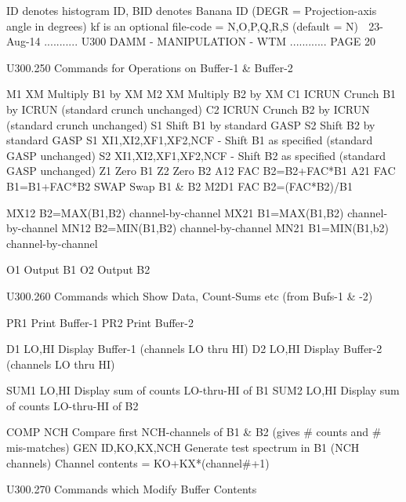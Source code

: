    ID denotes histogram ID, BID denotes Banana ID
   (DEGR = Projection-axis angle in degrees)
   kf is an optional file-code = N,O,P,Q,R,S (default = N)
    
   23-Aug-14 ........... U300  DAMM - MANIPULATION - WTM ............ PAGE  20
 
   U300.250  Commands for Operations on Buffer-1 & Buffer-2
 
   M1  XM             Multiply B1 by XM
   M2  XM             Multiply B2 by XM
   C1  ICRUN          Crunch B1  by ICRUN (standard crunch unchanged)
   C2  ICRUN          Crunch B2  by ICRUN (standard crunch unchanged)
   S1                 Shift  B1  by standard GASP
   S2                 Shift  B2  by standard GASP
   S1  XI1,XI2,XF1,XF2,NCF - Shift B1 as specified (standard GASP unchanged)
   S2  XI1,XI2,XF1,XF2,NCF - Shift B2 as specified (standard GASP unchanged)
   Z1                 Zero B1
   Z2                 Zero B2
   A12  FAC           B2=B2+FAC*B1
   A21  FAC           B1=B1+FAC*B2
   SWAP               Swap B1 & B2
   M2D1 FAC           B2=(FAC*B2)/B1
 
   MX12               B2=MAX(B1,B2) channel-by-channel
   MX21               B1=MAX(B1,B2) channel-by-channel
   MN12               B2=MIN(B1,B2) channel-by-channel
   MN21               B1=MIN(B1,b2) channel-by-channel
 
   O1                 Output B1
   O2                 Output B2
 
   U300.260  Commands which Show Data, Count-Sums etc (from Bufs-1 & -2)
 
   PR1                Print   Buffer-1
   PR2                Print   Buffer-2
 
   D1   LO,HI         Display Buffer-1 (channels LO thru HI)
   D2   LO,HI         Display Buffer-2 (channels LO thru HI)
 
   SUM1 LO,HI         Display sum of counts LO-thru-HI of B1
   SUM2 LO,HI         Display sum of counts LO-thru-HI of B2
 
   COMP NCH           Compare first NCH-channels of B1 & B2
                      (gives # counts and # mis-matches)
   GEN  ID,KO,KX,NCH  Generate test spectrum in B1 (NCH channels)
                      Channel contents = KO+KX*(channel#+1)
 
   U300.270  Commands which Modify Buffer Contents
 
